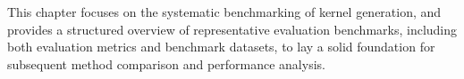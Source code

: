 \newcommand{\perf}{%
  \tikz[baseline=(char.base)]{
    \node[
      circle,
      fill=red!100!red,   %
      text=white,            %
      inner sep=0.6pt,
      draw=black,            %
      font=\sffamily\bfseries\fontsize{8}{7}\selectfont
    ] (char) {P};
  }%
}

\newcommand{\similarity}{%
  \tikz[baseline=(char.base)]{
    \node[
      circle,
      fill=red!100!red,   %
      text=white,            %
      inner sep=0.6pt,
      draw=black,            %
      font=\sffamily\bfseries\fontsize{8}{7}\selectfont
    ] (char) {S};
  }%
}

This chapter focuses on the systematic benchmarking of kernel generation, and provides a structured overview of representative evaluation benchmarks, including both evaluation metrics and benchmark datasets, to lay a solid foundation for subsequent method comparison and performance analysis.


